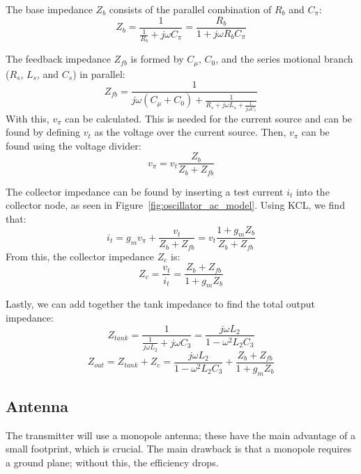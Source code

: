 The base impedance $Z_b$ consists of the parallel combination of $R_b$ and $C_\pi$:
\begin{equation}
	Z_b = \frac{1}{\frac{1}{R_b} + j\omega C_\pi} = \frac{R_b}{1 + j\omega R_b C_\pi}
\end{equation}

The feedback impedance $Z_{fb}$ is formed by $C_\mu$, $C_0$, and the series motional branch ($R_s$, $L_s$, and $C_s$) in parallel:
\begin{equation}
	Z_{fb} = \frac{1}{j\omega (C_\mu + C_0) + \frac{1}{R_s + j\omega L_s + \frac{1}{j\omega C_s}}}
\end{equation}
With this, $v_\pi$ can be calculated. This is needed for the current source and can be found by defining $v_t$ as the voltage over the current source. Then, $v_\pi$ can be found using the voltage divider:
\begin{equation}
	v_\pi = v_t \frac{Z_b}{Z_b + Z_{fb}}
\end{equation}

The collector impedance can be found by inserting a test current $i_t$ into the collector node, as seen in Figure~\ref{fig:oscillator_ac_model}. Using KCL, we find that:
\begin{equation}
	i_t = g_m v_\pi + \frac{v_t}{Z_b + Z_{fb}} = v_t \frac{1 + g_m Z_b}{Z_b + Z_{fb}}
\end{equation}
From this, the collector impedance $Z_c$ is:
\begin{equation}
	Z_c = \frac{v_t}{i_t} = \frac{Z_b + Z_{fb}}{1 + g_m Z_b}
\end{equation}

Lastly, we can add together the tank impedance to find the total output impedance:
\begin{equation}
	Z_{tank} = \frac{1}{\frac{1}{j\omega L_2} + j\omega C_3} = \frac{j\omega L_2}{1 - \omega^2 L_2 C_3}
\end{equation}
\begin{equation}
	Z_{out} = Z_{tank} + Z_c = \frac{j\omega L_2}{1 - \omega^2 L_2 C_3} + \frac{Z_b + Z_{fb}}{1 + g_m Z_b}
\end{equation}

\subsection{Antenna}
The transmitter will use a monopole antenna; these have the main advantage of a small footprint, which is crucial. The main drawback is that a monopole requires a ground plane; without this, the efficiency drops. 

